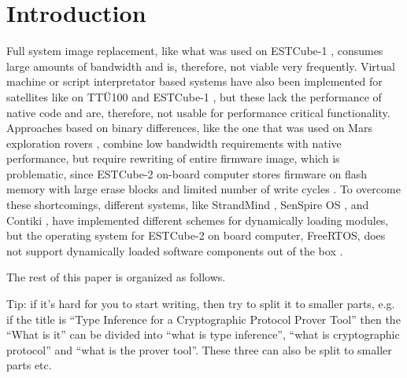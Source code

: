 \newpage
\section{Introduction}

Full system image replacement, like what was used on ESTCube-1 \cite{Tarbe2013,Suenter2016}, consumes large amounts of bandwidth and is, therefore, not viable very frequently. Virtual machine or script interpretator based systems have also been implemented for satellites like on TTÜ100 \cite{Aasavaeli2017} and ESTCube-1 \cite{Ehrpais2016}, but these lack the performance of native code and are, therefore, not usable for performance critical functionality. Approaches based on binary differences, like the one that was used on Mars exploration rovers \cite{Greco2005}, combine low bandwidth requirements with native performance, but require rewriting of entire firmware image, which is problematic, since ESTCube-2 on-board computer stores firmware on flash memory with large erase blocks and limited number of write cycles \cite{Haljaste2017}. To overcome these shortcomings, different systems, like StrandMind \cite{Bridges2013}, SenSpire OS \cite{Dong2009}, and Contiki \cite{Dunkels2006}, have implemented different schemes for dynamically loading modules, but the operating system for ESTCube-2 on board computer, FreeRTOS, does not support dynamically loaded software components out of the box \cite{Barry2005}. 


The rest of this paper is organized as follows.

Tip: if it's hard for you to start writing, then try to split it to smaller parts, e.g. if the title is ``Type Inference for a Cryptographic Protocol Prover Tool'' then the ``What is it'' can be divided into ``what is type inference'', ``what is cryptographic protocol'' and ``what is the prover tool''. These three can also be split to smaller parts etc.

